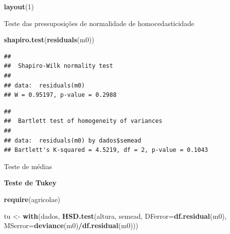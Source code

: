 \documentclass[
]{book}
\newenvironment{Shaded}{\begin{snugshade}}{\end{snugshade}}
\newcommand{\DataTypeTok}[1]{\textcolor[rgb]{0.13,0.29,0.53}{#1}}
\newcommand{\DecValTok}[1]{\textcolor[rgb]{0.00,0.00,0.81}{#1}}
\newcommand{\KeywordTok}[1]{\textcolor[rgb]{0.13,0.29,0.53}{\textbf{#1}}}
\newcommand{\NormalTok}[1]{#1}
\newcommand{\OperatorTok}[1]{\textcolor[rgb]{0.81,0.36,0.00}{\textbf{#1}}}
\newcommand{\StringTok}[1]{\textcolor[rgb]{0.31,0.60,0.02}{#1}}
\begin{document}
\begin{Shaded}
\begin{Highlighting}[]
\KeywordTok{layout}\NormalTok{(}\DecValTok{1}\NormalTok{)}
\end{Highlighting}
\end{Shaded}

Teste das pressuposições de normalidade de homocedasticidade

\begin{Shaded}
\begin{Highlighting}[]
\KeywordTok{shapiro.test}\NormalTok{(}\KeywordTok{residuals}\NormalTok{(m0))}
\end{Highlighting}
\end{Shaded}

\begin{verbatim}
## 
##  Shapiro-Wilk normality test
## 
## data:  residuals(m0)
## W = 0.95197, p-value = 0.2988
\end{verbatim}

\begin{Shaded}
\end{Shaded}

\begin{verbatim}
## 
##  Bartlett test of homogeneity of variances
## 
## data:  residuals(m0) by dados$semead
## Bartlett's K-squared = 4.5219, df = 2, p-value = 0.1043
\end{verbatim}

Teste de médias

\textbf{Teste de Tukey}

\begin{Shaded}
\begin{Highlighting}[]
\KeywordTok{require}\NormalTok{(agricolae)}
\end{Highlighting}
\end{Shaded}

\begin{Shaded}
\begin{Highlighting}[]
\NormalTok{tu <-}\StringTok{ }\KeywordTok{with}\NormalTok{(dados, }\KeywordTok{HSD.test}\NormalTok{(altura, semead,}
\DataTypeTok{DFerror=}\KeywordTok{df.residual}\NormalTok{(m0),}
\DataTypeTok{MSerror=}\KeywordTok{deviance}\NormalTok{(m0)}\OperatorTok{/}\KeywordTok{df.residual}\NormalTok{(m0)))}
\end{Highlighting}
\end{Shaded}
\end{document}
